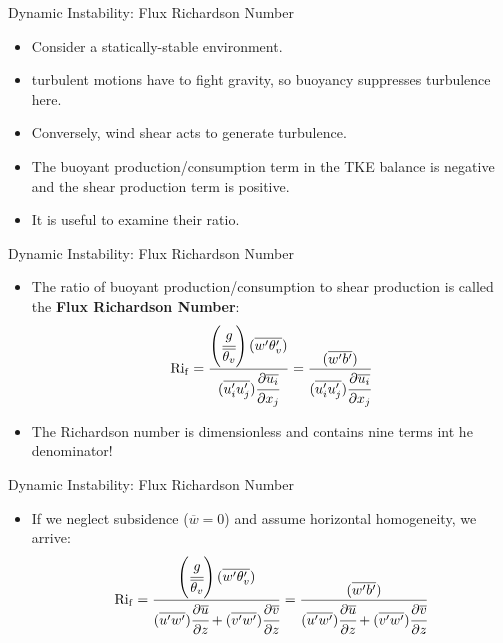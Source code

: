 \begin{frame}{Dynamic Instability: Flux Richardson Number}
\begin{itemize}
	\item Consider a statically-stable environment.
	\item turbulent motions have to fight gravity, so buoyancy suppresses turbulence here.
	\item Conversely, wind shear acts to generate turbulence.
	\item The buoyant production/consumption term in the TKE balance is negative and the shear production term is positive.
	\item It is useful to examine their ratio.
\end{itemize}
\end{frame}
\begin{frame}{Dynamic Instability: Flux Richardson Number}
\begin{itemize}
	\item The ratio of buoyant production/consumption to shear production is called the \textbf{Flux Richardson Number}:
	$$\mathrm{Ri_f} = \frac{ \left(\cfrac{g}{\overline{\theta_v}}\right) (\overline{w^\prime \theta_v^\prime})}{(\overline{u_i^\prime u_j^\prime})\cfrac{\partial \overline{u_i}}{\partial x_j}} = \frac{(\overline{w^\prime b^\prime})}{(\overline{u_i^\prime u_j^\prime})\cfrac{\partial \overline{u_i}}{\partial x_j}}$$
	\item The Richardson number is dimensionless and contains nine terms int he denominator!
\end{itemize}
\end{frame}
\begin{frame}{Dynamic Instability: Flux Richardson Number}
\begin{itemize}
	\item If we neglect subsidence ($\overline{w}=0$) and assume horizontal homogeneity, we arrive:
	$$\mathrm{Ri_f} = \frac{ \left(\cfrac{g}{\overline{\theta_v}}\right) (\overline{w^\prime \theta_v^\prime})}{(\overline{u^\prime w^\prime})\cfrac{\partial \overline{u}}{\partial z} + (\overline{v^\prime w^\prime})\cfrac{\partial \overline{v}}{\partial z}} = \frac{(\overline{w^\prime b^\prime})}{(\overline{u^\prime w^\prime})\cfrac{\partial \overline{u}}{\partial z} + (\overline{v^\prime w^\prime})\cfrac{\partial \overline{v}}{\partial z}}$$
\end{itemize}
\end{frame}
